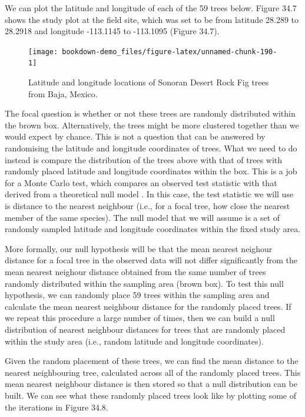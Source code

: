 \documentclass[
]{scrbook}
\begin{document}
We can plot the latitude and longitude of each of the 59 trees below.
Figure 34.7 shows the study plot at the field site, which was set to be from latitude 28.289 to 28.2918 and longitude -113.1145 to -113.1095 (Figure 34.7).

\begin{figure}
\texttt{[image: bookdown-demo\_files/figure-latex/unnamed-chunk-190-1]} \caption{Latitude and longitude locations of Sonoran Desert Rock Fig trees from Baja, Mexico.}\label{fig:unnamed-chunk-190}
\end{figure}

The focal question is whether or not these trees are randomly distributed within the brown box.
Alternatively, the trees might be more clustered together than we would expect by chance.
This is not a question that can be answered by randomising the latitude and longitude coordinates of trees.
What we need to do instead is compare the distribution of the trees above with that of trees with randomly placed latitude and longitude coordinates within the box.
This is a job for a Monte Carlo test, which compares an observed test statistic with that derived from a theoretical null model \citep{Manly2007}.
In this case, the test statistic we will use is distance to the nearest neighbour (i.e., for a focal tree, how close the nearest member of the same species).
The null model that we will assume is a set of randomly sampled latitude and longitude coordinates within the fixed study area.

More formally, our null hypothesis will be that the mean nearest neighour distance for a focal tree in the observed data will not differ significantly from the mean nearest neighour distance obtained from the same number of trees randomly distributed within the sampling area (brown box).
To test this null hypothesis, we can randomly place 59 trees within the sampling area and calculate the mean nearest neighbour distance for the randomly placed trees.
If we repeat this procedure a large number of times, then we can build a null distribution of nearest neighbour distances for trees that are randomly placed within the study area (i.e., random latitude and longitude coordinates).

Given the random placement of these trees, we can find the mean distance to the nearest neighbouring tree, calculated across all of the randomly placed trees.
This mean nearest neighbour distance is then stored so that a null distribution can be built.
We can see what these randomly placed trees look like by plotting some of the iterations in Figure 34.8.
\end{document}
